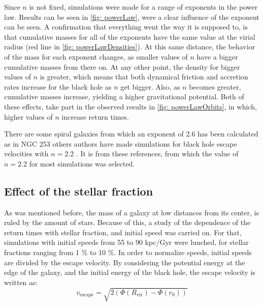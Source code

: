 		Since $n$ is not fixed, simulations were made for a range of exponents in the power law. Results can be seen in \autoref{fig: powerLaw}, were a clear influence of the exponent can be seen. A confirmation that everything went the way it is supposed to, is that cumulative masses for all of the exponents have the same value at the virial radius (red line in \autoref{fig: powerLawDensities}). At this same distance, the behavior of the mass for each exponent changes, as smaller values of $n$ have a bigger cumulative masses from there on. At any other point, the density for bigger values of $n$ is greater, which means that both dynamical friction and accretion rates increase for the black hole as $n$ get bigger. Also, as $n$ becomes greater, cumulative masses increase, yielding a higher gravitational potential. Both of these effects, take part in the observed results in \autoref{fig: powerLawOrbits}, in which, higher values of $n$ increase return times.
		
		There are some spiral galaxies from which an exponent of 2.6 has been calculated as in NGC 253 \cite{sorai2000distribution} others authors have made simulations for black hole escape velocities with $n = 2.2$ \cite{tanaka2009assembly, choksi2017recoiling}. It is from these references, from which the value of $n = 2.2$ for most simulations was selected.
		
	\subsection{Effect of the stellar fraction}
		As was mentioned before, the mass of a galaxy at low distances from its center, is ruled by the amount of stars. Because of this, a study of the dependence of the return times with stellar fraction, and initial speed was carried on. For that, simulations with initial speeds from 55 to 90 kpc/Gyr were lunched, for stellar fractions ranging from 1 \% to 10 \%. In order to normalize speeds, initial speeds are divided by the escape velocity. By considering the potential energy at the edge of the galaxy, and the initial energy of the black hole, the escape velocity is written as:
		\begin{equation}
			v_\text{escape} = \sqrt{2 \left(\Phi(R_\text{vir}) - \Phi(r_0)\right)}
		\end{equation}
		
